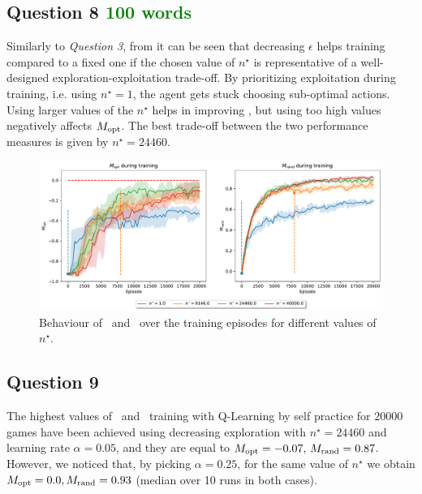 \documentclass[10pt]{IEEEtran}
\begin{document}
\subsection*{Question 8  \textcolor{green}{100 words}}
Similarly to \emph{Question 3}, from  it can be seen that decreasing $\epsilon$ helps training compared to a fixed one if the chosen value of $n^{\star}$ is representative of a well-designed exploration-exploitation trade-off. By prioritizing exploitation during training, i.e. using $n^{\star} = 1$, the agent gets stuck choosing sub-optimal actions. Using larger values of the $n^{\star}$ helps in improving \mrand, but using too high values negatively affects $M_{\text{opt}}$. The best trade-off between the two performance measures is given by $n^{\star} = 24460$.  

\begin{figure}[h]
    \centering
    \includegraphics[width=\linewidth]{code/figures/performance_n_star_self.pdf}
    \caption{Behaviour of \mopt\ and \mrand\ over the training episodes for different values of $n^{\star}$.}
    \label{plot_question8}
\end{figure}

\subsection*{Question 9}
The highest values of \mopt\  and \mrand\  training with Q-Learning by self practice for $20000$ games have been achieved using decreasing exploration with $n^{\star} = 24460$ and learning rate $\alpha = 0.05$, and they are equal to $M_{\text{opt}} = -0.07, \, M_{\text{rand}} = 0.87$. However, we noticed that, by picking $\alpha = 0.25$, for the same value of $n^{\star}$ we obtain $M_{\text{opt}} = 0.0, M_{\text{rand}} = 0.93$ (median over 10 runs in both cases).
\end{document}
